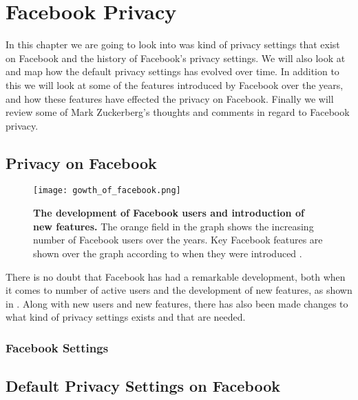 \chapter{Facebook Privacy}
\label{chp:defaultprivacysettings} 

In this chapter we are going to look into was kind of privacy settings that exist on Facebook and the history of Facebook's privacy settings. We will also look at and map how the default privacy settings has evolved over time. In addition to this we will look at some of the features introduced by Facebook over the years, and how these features have effected the privacy on Facebook. Finally we will review some of Mark Zuckerberg's  thoughts and comments in regard to Facebook privacy. 


\section{Privacy on Facebook}\label{sec:privacy_on_facebook}


\begin{figure}[h!]
\centering
\texttt{[image: gowth\_of\_facebook.png]}
\caption[The development of Facebook users and introduction of new features]{\textbf{The development of Facebook users and introduction of new features.} The orange field in the graph shows the increasing number of Facebook users over the years. Key Facebook features are shown over the graph according to when they were introduced \cite{BBCFacebookGrowth}.} 
\label{fig:growth_of_facebook}
\end{figure}

There is no doubt that Facebook has had a remarkable development, both when it comes to number of active users and the development of new features, as shown in . Along with new users and new features, there has also been made changes to what kind of privacy settings exists and that are needed. 


\subsection{Facebook Settings}



\section{Default Privacy Settings on Facebook}\label{sec:default_privacy_settings}

